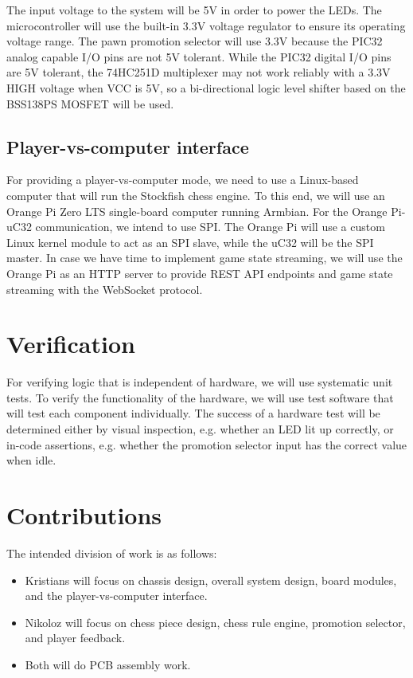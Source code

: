 \documentclass{article}
\begin{document}
The input voltage to the system will be 5V in order to power the LEDs. The microcontroller will use the built-in 3.3V voltage regulator to ensure its operating voltage range. The pawn promotion selector will use 3.3V because the PIC32 analog capable I/O pins are not 5V tolerant. While the PIC32 digital I/O pins are 5V tolerant, the 74HC251D multiplexer may not work reliably with a 3.3V HIGH voltage when VCC is 5V, so a bi-directional logic level shifter based on the BSS138PS MOSFET will be used.

\subsection*{Player-vs-computer interface}

For providing a player-vs-computer mode, we need to use a Linux-based computer that will run the Stockfish chess engine. To this end, we will use an Orange Pi Zero LTS single-board computer running Armbian. For the Orange Pi-uC32 communication, we intend to use SPI. The Orange Pi will use a custom Linux kernel module to act as an SPI slave, while the uC32 will be the SPI master. In case we have time to implement game state streaming, we will use the Orange Pi as an HTTP server to provide REST API endpoints and game state streaming with the WebSocket protocol.

\section{Verification}

For verifying logic that is independent of hardware, we will use systematic unit tests. To verify the functionality of the hardware, we will use test software that will test each component individually. The success of a hardware test will be determined either by visual inspection, e.g. whether an LED lit up correctly, or in-code assertions, e.g. whether the promotion selector input has the correct value when idle.

\section{Contributions}

The intended division of work is as follows:
\begin{itemize}
	\item Kristians will focus on chassis design, overall system design, board modules, and the player-vs-computer interface.
	\item Nikoloz will focus on chess piece design, chess rule engine, promotion selector, and player feedback.
	\item Both will do PCB assembly work.
\end{itemize}
\end{document}
